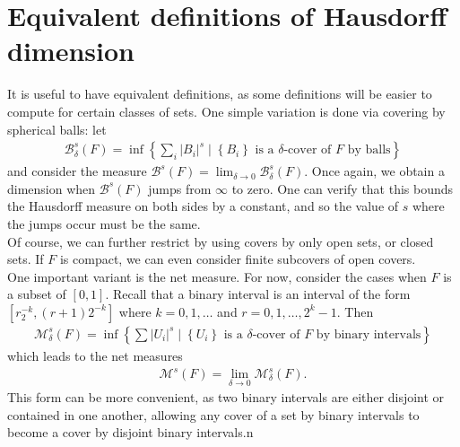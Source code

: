 \documentclass{memoir}
\begin{document}

\section{Equivalent definitions of Hausdorff dimension}
\label{sec:equivalent_definitions_of_hausdorff_dimension}

It is useful to have equivalent definitions, as some definitions will be easier to compute for certain classes of sets. One simple variation is done via covering by spherical balls: let
\begin{align*}
	\mathcal{B}^{s}_{\delta}(F) = \inf \left\{\sum_{i} \left| B_i \right|^{s} \mid \left\{ B_i \right\} \text{ is a \(\delta\)-cover of \(F\) by balls} \right\} 
\end{align*}
and consider the measure \(\mathcal{B}^{s}(F) = \lim_{\delta \to 0} \mathcal{B}^{s}_\delta(F)\). Once again, we obtain a dimension when \(\mathcal{B}^{s}(F)\) jumps from \(\infty\) to zero. One can verify that this bounds the Hausdorff measure on both sides by a constant, and so the value of \(s\) where the jumps occur must be the same.\\

Of course, we can further restrict by using covers by only open sets, or closed sets. If \(F\) is compact, we can even consider finite subcovers of open covers.\\

One important variant is the net measure. For now, consider the cases when \(F\) is a subset of \([0,1]\). Recall that a binary interval is an interval of the form \([r_2^{-k},(r+1)2^{-k}]\) where \(k = 0,1,\ldots\) and \(r = 0,1,\ldots,2^{k}-1\). Then
\begin{align*}
	\mathcal{M}^{s}_{\delta}(F) = \inf \left\{ \sum \left| U_i \right|^{s} \mid \left\{ U_i \right\} \text{ is a \(\delta\)-cover of \(F\) by binary intervals} \right\} 
\end{align*}
which leads to the net measures
\begin{align*}
	\mathcal{M}^{s}(F) = \lim_{\delta \to 0} \mathcal{M}^{s}_\delta (F).
\end{align*}
This form can be more convenient, as two binary intervals are either disjoint or contained in one another, allowing any cover of a set by binary intervals to become a cover by disjoint binary intervals.n

\end{document}
